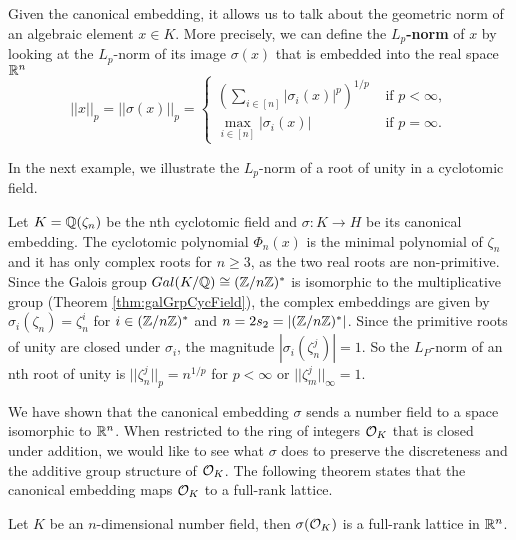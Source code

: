 \documentclass[../main.tex]{subfiles}
\begin{document}
Given the canonical embedding, it allows us to talk about the geometric norm of an algebraic element $x \in K$. More precisely, we can define the \textbf{$L_p$-norm} 
\reversemarginpar
{}
of $x$ by looking at the $L_p$-norm of its image $\sigma(x)$ that is embedded into the real space $\mathbb{R}^n$
\begin{equation}
\label{eq:lpNorm}
||x||_p = ||\sigma(x)||_p = 
\begin{cases}
\left( \sum_{i \in [n]} |\sigma_i(x)|^p \right)^{1/p} & \text{ if $p < \infty$},  \\
\max_{i \in [n]} |\sigma_i(x)| & \text{ if $p = \infty$}.
\end{cases}
\end{equation}

In the next example, we illustrate the $L_p$-norm of a root of unity in a cyclotomic field. 
\begin{example}
	
	Let $K=\mathbb{Q}(\zeta_n)$ be the nth cyclotomic field and $\sigma: K \rightarrow H$ be its canonical embedding. The cyclotomic polynomial $\Phi_n(x)$ is the minimal polynomial of $\zeta_n$ and it has only complex roots for $n \ge 3$, as the two real roots are non-primitive. Since the Galois group $Gal(K/\mathbb{Q}) \cong (\mathbb{Z}/n\mathbb{Z})^*$ is isomorphic to the multiplicative group (Theorem \ref{thm:galGrpCycField}), the complex embeddings are given by $\sigma_i(\zeta_n) = \zeta_n^i$ for $i \in (\mathbb{Z}/n\mathbb{Z})^*$ and $n = 2s_2 = |(\mathbb{Z}/n\mathbb{Z})^*|$.
	Since the primitive roots of unity are closed under $\sigma_i$, the magnitude $|\sigma_i(\zeta_n^j)|=1$. So the $L_P$-norm of an nth root of unity is  $||\zeta_n^j||_p = n^{1/p}$ for $p < \infty$ or $||\zeta_m^j||_{\infty} = 1$.
\end{example}

We have shown that the canonical embedding $\sigma$ sends a number field to a space isomorphic to $\mathbb{R}^n$. When restricted to the ring of integers $\mathcal{O}_K$ that is closed under addition, we would like to see what $\sigma$ does to preserve the discreteness and the additive group structure of $\mathcal{O}_K$. The following theorem states that the canonical embedding maps $\mathcal{O}_K$ to a full-rank lattice. 


\begin{theorem}
	\label{thm:rngIntLat}
	\reversemarginpar
	Let $K$ be an $n$-dimensional number field, then $\sigma(\mathcal{O}_K)$ is a full-rank lattice in $\mathbb{R}^n$. 
\end{theorem}
\end{document}
